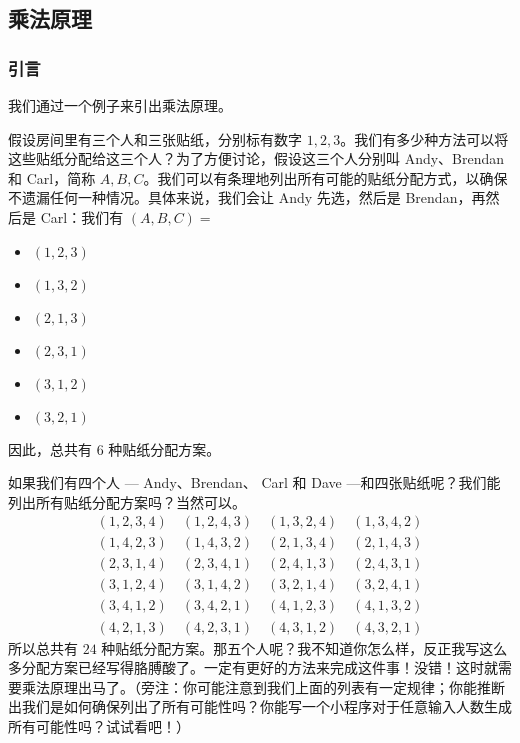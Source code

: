 
\subsection{乘法原理}

\subsubsection*{引言}

我们通过一个例子来引出乘法原理。\\

\begin{example}
    假设房间里有三个人和三张贴纸，分别标有数字 $1, 2, 3$。我们有多少种方法可以将这些贴纸分配给这三个人？为了方便讨论，假设这三个人分别叫 Andy、Brendan 和 Carl，简称 $A, B, C$。我们可以有条理地列出所有可能的贴纸分配方式，以确保不遗漏任何一种情况。具体来说，我们会让 Andy 先选，然后是 Brendan，再然后是 Carl：我们有 $(A, B, C) = $
    \begin{itemize}
        \item $(1, 2, 3)$
        \item $(1, 3, 2)$
        \item $(2, 1, 3)$
        \item $(2, 3, 1)$
        \item $(3, 1, 2)$
        \item $(3, 2, 1)$
    \end{itemize}
    因此，总共有 $6$ 种贴纸分配方案。

    如果我们有四个人 --- Andy、Brendan、 Carl 和 Dave ---和四张贴纸呢？我们能列出所有贴纸分配方案吗？当然可以。
    \begin{align*}
        (1, 2, 3, 4) \quad (1, 2, 4, 3) \quad (1, 3, 2, 4) \quad (1, 3, 4, 2) \\
        (1, 4, 2, 3) \quad (1, 4, 3, 2) \quad (2, 1, 3, 4) \quad (2, 1, 4, 3) \\
        (2, 3, 1, 4) \quad (2, 3, 4, 1) \quad (2, 4, 1, 3) \quad (2, 4, 3, 1) \\
        (3, 1, 2, 4) \quad (3, 1, 4, 2) \quad (3, 2, 1, 4) \quad (3, 2, 4, 1) \\
        (3, 4, 1, 2) \quad (3, 4, 2, 1) \quad (4, 1, 2, 3) \quad (4, 1, 3, 2) \\
        (4, 2, 1, 3) \quad (4, 2, 3, 1) \quad (4, 3, 1, 2) \quad (4, 3, 2, 1)
    \end{align*}
    所以总共有 $24$ 种贴纸分配方案。那五个人呢？我不知道你怎么样，反正我写这么多分配方案已经写得胳膊酸了。一定有更好的方法来完成这件事！没错！这时就需要乘法原理出马了。（旁注：你可能注意到我们上面的列表有一定规律；你能推断出我们是如何确保列出了所有可能性吗？你能写一个小程序对于任意输入人数生成所有可能性吗？试试看吧！）
\end{example}

